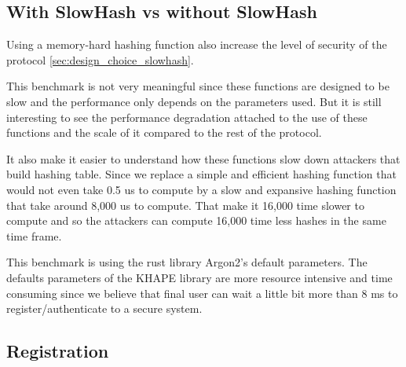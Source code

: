 \documentclass[../report.tex]{subfiles}
\begin{document}
\subsection{With SlowHash vs without SlowHash} %

Using a memory-hard hashing function also increase the level of security of the protocol \ref{sec:design_choice_slowhash}.


This benchmark is not very meaningful since these functions are designed to be slow and the performance only depends on the parameters used. But it is still interesting to see the performance degradation attached to the use of these functions and the scale of it compared to the rest of the protocol.

It also make it easier to understand how these functions slow down attackers that build hashing table. Since we replace a simple and efficient hashing function that would not even take 0.5 us to compute by a slow and expansive hashing function that take around 8,000 us to compute. That make it 16,000 time slower to compute and so the attackers can compute 16,000 time less hashes in the same time frame.

This benchmark is using the rust library Argon2's default parameters. The defaults parameters of the KHAPE library are more resource intensive and time consuming since we believe that final user can wait a little bit more than 8 ms to register/authenticate to a secure system.


\subsection*{Registration}

\end{document}
